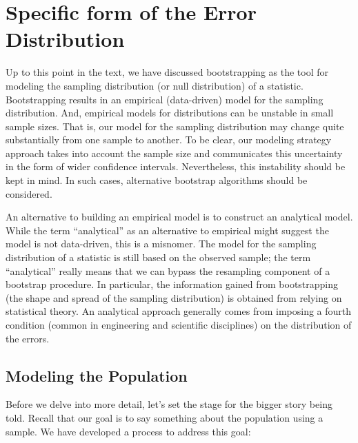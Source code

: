 \documentclass[
  letterpaper,
  DIV=11,
  numbers=noendperiod]{scrreprt}
\theoremstyle{definition}
\theoremstyle{definition}
\theoremstyle{plain}
\theoremstyle{remark}
\begin{document}
\hypertarget{specific-form-of-the-error-distribution}{%
\section{Specific form of the Error
Distribution}\label{specific-form-of-the-error-distribution}}

Up to this point in the text, we have discussed bootstrapping as the
tool for modeling the sampling distribution (or null distribution) of a
statistic. Bootstrapping results in an empirical (data-driven) model for
the sampling distribution. And, empirical models for distributions can
be unstable in small sample sizes. That is, our model for the sampling
distribution may change quite substantially from one sample to another.
To be clear, our modeling strategy approach takes into account the
sample size and communicates this uncertainty in the form of wider
confidence intervals. Nevertheless, this instability should be kept in
mind. In such cases, alternative bootstrap algorithms should be
considered.

An alternative to building an empirical model is to construct an
analytical model. While the term ``analytical'' as an alternative to
empirical might suggest the model is not data-driven, this is a
misnomer. The model for the sampling distribution of a statistic is
still based on the observed sample; the term ``analytical'' really means
that we can bypass the resampling component of a bootstrap procedure. In
particular, the information gained from bootstrapping (the shape and
spread of the sampling distribution) is obtained from relying on
statistical theory. An analytical approach generally comes from imposing
a fourth condition (common in engineering and scientific disciplines) on
the distribution of the errors.

\hypertarget{modeling-the-population}{%
\subsection{Modeling the Population}\label{modeling-the-population}}

Before we delve into more detail, let's set the stage for the bigger
story being told. Recall that our goal is to say something about the
population using a sample. We have developed a process to address this
goal:
\end{document}
